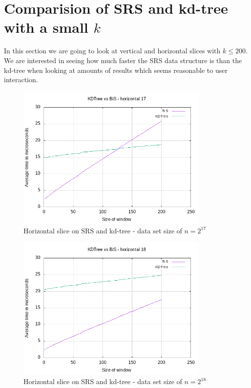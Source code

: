\section{Comparision of SRS and kd-tree with a small $k$}

In this section we are going to look at vertical and horizontal slices with $k\leq 200$. We are interested in seeing how much faster the SRS data structure is than the kd-tree when looking at amounts of results which seems reasonable to user interaction.

\begin{figure}[h]
    \centering
    \includegraphics[width = 0.85\textwidth]{pictures/analysis/smalls/hori_17.png}
    \caption{Horizontal slice on SRS and kd-tree - data set size of $n=2^{17}$}\label{fig:small_hori_17}
\end{figure}

\begin{figure}[h]
    \centering
    \includegraphics[width = 0.85\textwidth]{pictures/analysis/smalls/hori_18.png}
    \caption{Horizontal slice on SRS and kd-tree - data set size of $n=2^{18}$}\label{fig:small_hori_18}
\end{figure}

